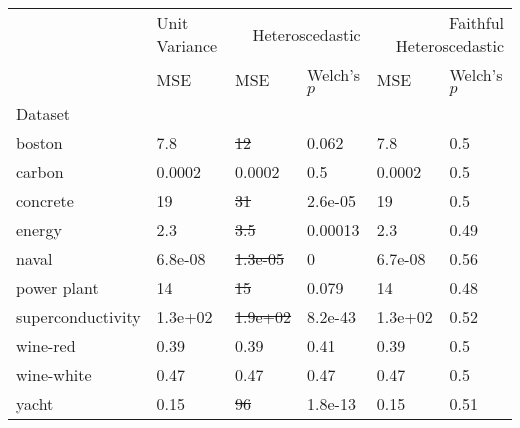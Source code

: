 \begin{tabular}{l|l|ll|ll}
\toprule
 & Unit Variance & \multicolumn{2}{r}{Heteroscedastic} & \multicolumn{2}{r}{Faithful Heteroscedastic} \\
 & MSE & MSE & Welch's $p$ & MSE & Welch's $p$ \\
Dataset &  &  &  &  &  \\
\midrule
boston & 7.8 & \sout{12} & 0.062 & 7.8 & 0.5 \\
carbon & 0.0002 & 0.0002 & 0.5 & 0.0002 & 0.5 \\
concrete & 19 & \sout{31} & 2.6e-05 & 19 & 0.5 \\
energy & 2.3 & \sout{3.5} & 0.00013 & 2.3 & 0.49 \\
naval & 6.8e-08 & \sout{1.3e-05} & 0 & 6.7e-08 & 0.56 \\
power plant & 14 & \sout{15} & 0.079 & 14 & 0.48 \\
superconductivity & 1.3e+02 & \sout{1.9e+02} & 8.2e-43 & 1.3e+02 & 0.52 \\
wine-red & 0.39 & 0.39 & 0.41 & 0.39 & 0.5 \\
wine-white & 0.47 & 0.47 & 0.47 & 0.47 & 0.5 \\
yacht & 0.15 & \sout{96} & 1.8e-13 & 0.15 & 0.51 \\
\bottomrule
\end{tabular}
